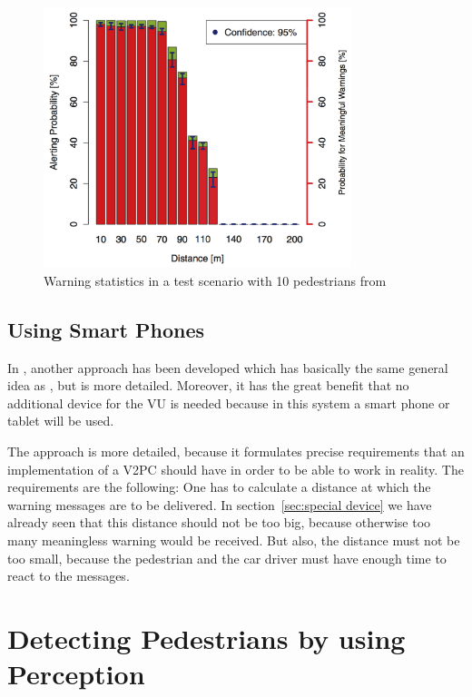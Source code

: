 \documentclass[]{ccs-thesis}
\begin{document}
\begin{figure}[h]
	\centering
	\includegraphics[width=0.8\textwidth]{figures/3_chart}
	\caption{Warning statistics in a test scenario with 10 pedestrians from \cite{v2pprotection}}%
	\label{fig:chart2}%
\end{figure}

\section{Using Smart Phones}

In \cite{v2pcomm}, another approach has been developed which has basically the same general idea as \cite{v2pprotection}, but is more detailed. Moreover, it has the great benefit that no additional device for the \ac{VU} is needed because in this system a smart phone or tablet will be used.

The approach is more detailed, because it formulates precise requirements that an implementation of a \ac{V2PC} should have in order to be able to work in reality. The  requirements are the following: One has to calculate a distance at which the warning messages are to be delivered. In section~\ref{sec:special device} we have already seen that this distance should not be too big, because otherwise too many meaningless warning would be received. But also, the distance must not be too small, because the pedestrian and the car driver must have enough time to react to the messages.



\chapter{Detecting Pedestrians by using Perception}
\label{chap:perception}
\end{document}
